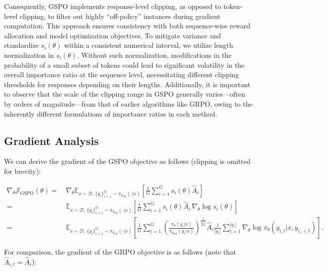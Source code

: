 Consequently, GSPO implements response-level clipping, as opposed to token-level clipping, to filter out highly ``off-policy'' instances during gradient computation. This approach ensures consistency with both sequence-wise reward allocation and model optimization objectives. To mitigate variance and standardize $s_{i}(\theta)$ within a consistent numerical interval, we utilize length normalization in $s_{i}(\theta)$. Without such normalization, modifications in the probability of a small subset of tokens could lead to significant volatility in the overall importance ratio at the sequence level, necessitating different clipping thresholds for responses depending on their lengths. Additionally, it is important to observe that the scale of the clipping range in GSPO generally varies—often by orders of magnitude—from that of earlier algorithms like GRPO, owing to the inherently different formulations of importance ratios in each method.

\subsection{Gradient Analysis}
\label{subsec:gradient}

We can derive the gradient of the GSPO objective as follows (clipping is omitted for brevity):

\begin{align}
\nabla_{\theta} \mathcal{J}_\text{GSPO} (\theta)
=&\ 
\nabla_{\theta} \mathbb{E}_{ x \sim \mathcal{D},\, \{y_i\}_{i=1}^G \sim \pi_{\theta_\text{old}}( \cdot | x) }
\left[ 
\frac{1}{G} \sum_{i=1}^{G} s_{i}(\theta) \widehat{A}_{i}
\right] \\
= &\ 
\mathbb{E}_{ x \sim \mathcal{D},\, \{y_i\}_{i=1}^G \sim \pi_{\theta_\text{old}}( \cdot | x) }
\left[ 
\frac{1}{G} \sum_{i=1}^{G}
s_{i}(\theta) \widehat{A}_{i}
\, \nabla_{\theta} \log s_{i}(\theta)
\right] \\
=&\ 
\mathbb{E}_{ x \sim \mathcal{D},\, \{y_i\}_{i=1}^G \sim \pi_{\theta_\text{old}}( \cdot | x) }
\left[ 
\frac{1}{G} \sum_{i=1}^{G} 
\left( \frac{ \pi_{\theta} (y_i | x) }{ \pi_{\theta_\text{old}} (y_i | x)} \right)^{\frac{1}{|y_i|}} \widehat{A}_{i} 
\frac{1}{|y_i|} \sum_{t=1}^{|y_i|} \nabla_{\theta} \log \pi_{\theta} (y_{i,t} | x, y_{i,<t}) 
\right].
\label{equ:gspo_grad}
\end{align}

For comparison, the gradient of the GRPO objective is as follows (note that $\widehat{A}_{i,t} = \widehat{A}_{i}$):

